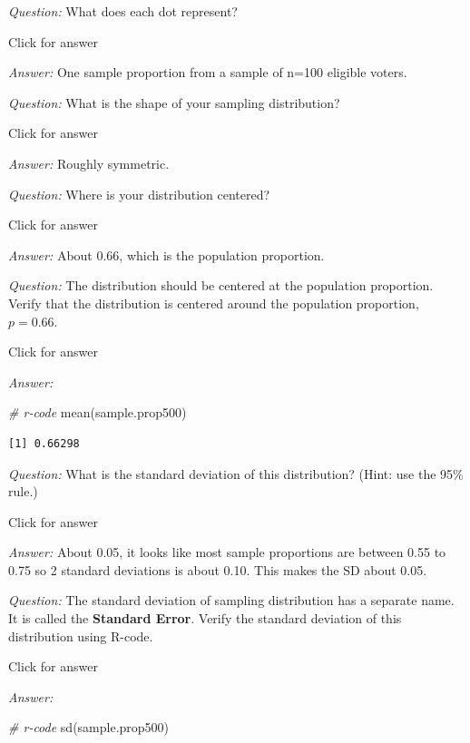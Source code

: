 \documentclass[
]{book}
\newenvironment{Shaded}{\begin{snugshade}}{\end{snugshade}}
\newcommand{\CommentTok}[1]{\textcolor[rgb]{0.56,0.35,0.01}{\textit{#1}}}
\newcommand{\FunctionTok}[1]{\textcolor[rgb]{0.00,0.00,0.00}{#1}}
\newcommand{\NormalTok}[1]{#1}
\begin{document}
\emph{Question:} What does each dot represent?

Click for answer

\emph{Answer:} One sample proportion from a sample of n=100 eligible voters.

\emph{Question:} What is the shape of your sampling distribution?

Click for answer

\emph{Answer:} Roughly symmetric.

\emph{Question:} Where is your distribution centered?

Click for answer

\emph{Answer:} About 0.66, which is the population proportion.

\emph{Question:} The distribution should be centered at the population proportion. Verify that the distribution is centered around the population proportion, \(p = 0.66\).

Click for answer

\emph{Answer:}

\begin{Shaded}
\begin{Highlighting}[]
\CommentTok{\# r{-}code}
\FunctionTok{mean}\NormalTok{(sample.prop500)}
\end{Highlighting}
\end{Shaded}

\begin{verbatim}
[1] 0.66298
\end{verbatim}

\emph{Question:} What is the standard deviation of this distribution? (Hint: use the 95\% rule.)

Click for answer

\emph{Answer:} About 0.05, it looks like most sample proportions are between 0.55 to 0.75 so 2 standard deviations is about 0.10. This makes the SD about 0.05.

\emph{Question:} The standard deviation of sampling distribution has a separate name. It is called the \textbf{Standard Error}. Verify the standard deviation of this distribution using R-code.

Click for answer

\emph{Answer:}

\begin{Shaded}
\begin{Highlighting}[]
\CommentTok{\# r{-}code}
\FunctionTok{sd}\NormalTok{(sample.prop500)}
\end{Highlighting}
\end{Shaded}
\end{document}
